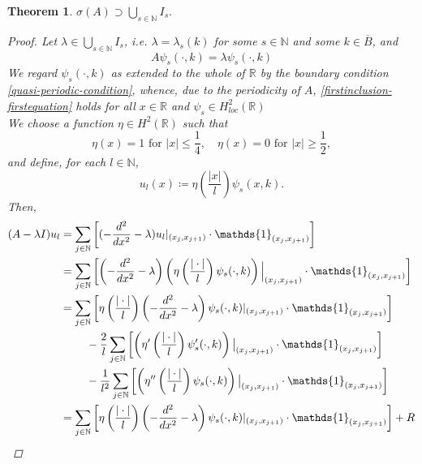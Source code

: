 \documentclass[fontsize=14pt,a4paper,DIV=1]{scrartcl}
\newtheorem{theorem}{Theorem}[section]
\numberwithin{equation}{section}
\newcommand{\R}{\mathbb{R}}
\newcommand{\N}{\mathbb{N}}
\begin{document}
\begin{theorem}
	$\sigma(A) \supset \bigcup_{s \in \N} I_{s}.$
	\begin{proof}
		Let $\lambda \in \bigcup_{s \in \N} I_{s}$, i.e. $\lambda = \lambda_{s}(k)$ for some $s \in \N$ and some $k \in \overline{B}$, and 
		\begin{equation}
			A \psi_{s}(\cdot, k) = \lambda \psi_{s}(\cdot, k) \label{firstinclusion-firstequation}
		\end{equation}
		We regard $\psi_{s}(\cdot, k)$ as extended to the whole of $\R$ by the boundary condition \eqref{quasi-periodic-condition}, whence, due to the periodicity of $A$, \eqref{firstinclusion-firstequation} holds for all $x \in \R$ and $\psi_{s} \in H^{2}_{loc}(\R)$ \\
		We choose a function $\eta \in H^{2}(\R)$ such that
			\[ \eta(x) = 1 \text{ for } |x| \leq \frac{1}{4}, \quad \eta(x) = 0 \text{ for } |x| \geq \frac{1}{2}, \]
		and define, for each $l \in \N$,
			\[ u_{l}(x) \coloneqq \eta\left(\frac{|x|}{l}\right) \psi_{s}(x, k). \]
	 	Then,
		\begin{align}
			(A - \lambda I) u_{l} & = \sum_{j \in \N} \left[ (- \frac{d^{2}}{dx^{2}} - \lambda) u_{l}|_{(x_{j}, x_{j+1})} \cdot \mathds{1}_{(x_{j}, x_{j+1})} \right] \label{eq:sepofspectraleq} \\
				& = \sum_{j \in \N} \left[ \left(- \frac{d^{2}}{dx^{2}} - \lambda \right) \left( \eta\left(\frac{|\cdot|}{l}\right) \psi_{s}(\cdot, k) \right)\Big|_{(x_{j}, x_{j+1})} \cdot \mathds{1}_{(x_{j}, x_{j+1})} \right] \notag \\
				& = \sum_{j \in \N} \left[ \eta\left(\frac{|\cdot|}{l}\right) \left(- \frac{d^{2}}{dx^{2}} - \lambda \right) \psi_{s}(\cdot, k) |_{(x_{j}, x_{j+1})} \cdot \mathds{1}_{(x_{j}, x_{j+1})} \right] \notag \\
				& ~\qquad - \frac{2}{l} \sum_{j \in \N} \left[ \left( \eta'\left(\frac{|\cdot|}{l}\right) \psi_{s}'(\cdot, k) \right)\big|_{(x_{j}, x_{j+1})} \cdot \mathds{1}_{(x_{j}, x_{j+1})}  \right] \notag \\
				& ~\qquad - \frac{1}{l^{2}} \sum_{j \in \N} \left[ \left( \eta''\left(\frac{|\cdot|}{l}\right) \psi_{s}(\cdot, k) \right)\big|_{(x_{j}, x_{j+1})} \cdot \mathds{1}_{(x_{j}, x_{j+1})} \right] \notag \\
				& = \sum_{j \in \N} \left[ \eta\left(\frac{|\cdot|}{l}\right) \left(- \frac{d^{2}}{dx^{2}} - \lambda \right) \psi_{s}(\cdot, k) |_{(x_{j}, x_{j+1})} \cdot \mathds{1}_{(x_{j}, x_{j+1})} \right] + R \notag
		\end{align}

\end{proof}
\end{theorem}
\end{document}
